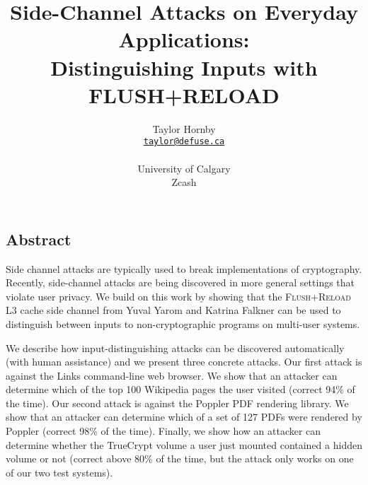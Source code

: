 \documentclass[letterpaper,twocolumn,10pt]{article}
\begin{document}
\date{}

\title{\Large \bf Side-Channel Attacks on Everyday Applications: \\
Distinguishing Inputs with FLUSH+RELOAD}

\author{
{\rm Taylor Hornby}\\
\rm \href{mailto:taylor@defuse.ca}{\texttt{taylor@defuse.ca}}\\
\\
University of Calgary\\
Zcash
} %

\maketitle



\subsection*{Abstract}
Side channel attacks are typically used to break implementations of
cryptography. Recently, side-channel attacks are being discovered in more
general settings that violate user privacy. We build on this work by showing
that the \textsc{Flush+Reload} L3 cache side channel from Yuval Yarom and
Katrina Falkner \cite{yarom2013flush} can be used to distinguish between inputs
to non-cryptographic programs on multi-user systems. 

We describe how input-distinguishing attacks can be discovered automatically
(with human assistance) and we present three concrete attacks. Our first attack
is against the Links command-line web browser. We show that an attacker can
determine which of the top 100 Wikipedia pages the user visited (correct 94\% of
the time). Our second attack is against the Poppler PDF rendering library. We
show that an attacker can determine which of a set of 127 PDFs were rendered by
Poppler (correct 98\% of the time). Finally, we show how an attacker can
determine whether the TrueCrypt volume a user just mounted contained a hidden
volume or not (correct above 80\% of the time, but the attack only works on one
of our two test systems).
\end{document}
